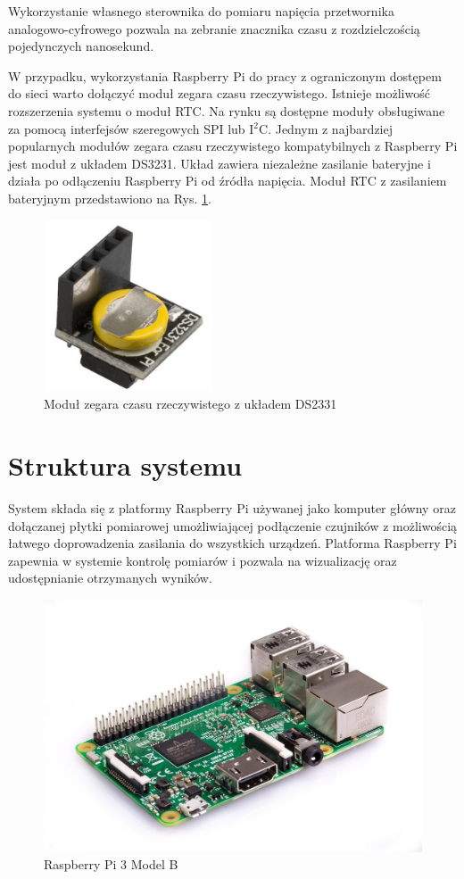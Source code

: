 Wykorzystanie własnego sterownika do pomiaru napięcia przetwornika analogowo-cyfrowego pozwala na zebranie znacznika czasu z rozdzielczością pojedynczych nanosekund. 

W przypadku, wykorzystania Raspberry Pi do pracy z ograniczonym dostępem do sieci warto dołączyć moduł zegara czasu rzeczywistego.
Istnieje możliwość rozszerzenia systemu o moduł RTC. Na rynku są dostępne moduły obsługiwane za pomocą interfejsów szeregowych SPI lub I$^2$C. Jednym z najbardziej popularnych modułów zegara czasu rzeczywistego kompatybilnych z Raspberry Pi jest moduł z układem DS3231\cite{rtc}. Układ zawiera niezależne zasilanie bateryjne i działa po odłączeniu Raspberry Pi od źródła napięcia.
Moduł RTC z zasilaniem bateryjnym przedstawiono na Rys. \ref{pic:rtc}. 

\begin{figure}[h]
	\centering
		\includegraphics[width=5cm]{rtc}
	\caption{Moduł zegara czasu rzeczywistego z układem DS2331} 
	\label{pic:rtc}
\end{figure}

\section{Struktura systemu}

System składa się z platformy Raspberry Pi używanej jako komputer główny oraz dołączanej płytki pomiarowej umożliwiającej podłączenie czujników z możliwością łatwego doprowadzenia zasilania do wszystkich urządzeń. Platforma Raspberry Pi zapewnia w systemie kontrolę pomiarów i pozwala na wizualizację oraz udostępnianie otrzymanych wyników. 


\begin{figure}[H]
	\centering
		\includegraphics[width=14cm]{rpi}
	\caption{Raspberry Pi 3 Model B} 
	\label{pic:RPi}
\end{figure}
\newpage
